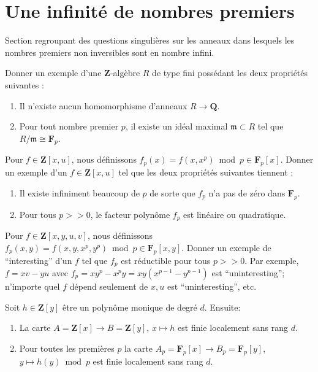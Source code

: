 \section{Une infinité de nombres premiers}
\label{section-many-primes}

\noindent
Section regroupant des questions singulières sur les anneaux dans lesquels
les nombres premiers non inversibles sont en nombre infini.

\begin{exercise}
\label{exercise-not-in-Q}
Donner un exemple d'une ${\mathbf Z}$-algèbre $R$ de type fini
possédant les deux propriétés suivantes :
\begin{enumerate}
\item Il n'existe aucun homomorphisme d'anneaux $R \to {\mathbf Q}$.
\item Pour tout nombre premier $p$, il existe un idéal maximal
${\mathfrak m} \subset R$ tel que $R/{\mathfrak m} \cong {\mathbf F}_p$.
\end{enumerate}
\end{exercise}

\begin{exercise}
\label{exercise-strange-fp-1}
Pour $f \in {\mathbf Z}[x, u]$, nous définissons $f_p(x)
= f(x, x^p) \bmod p \in {\mathbf F}_p[x]$. Donner un exemple
d'un $f \in {\mathbf Z}[x, u]$ tel que les deux propriétés
suivantes tiennent :
\begin{enumerate}
\item Il existe infiniment beaucoup de $p$ de sorte que
$f_p$ n'a pas de zéro dans ${\mathbf F}_p$.
\item Pour tous $p >> 0$, le facteur polynôme
$f_p$ est linéaire ou quadratique.
\end{enumerate}
\end{exercise}

\begin{exercise}
\label{exercise-strange-fp-2}
Pour $f \in {\mathbf Z}[x, y, u, v]$, nous définissons
$f_p(x, y) = f(x, y, x^p, y^p) \bmod p \in {\mathbf F}_p[x, y]$. Donner un
exemple de ``interesting'' d'un $f$ tel que $f_p$ est réductible pour
tous $p >> 0$. Par exemple, $f = xv-yu$ avec $f_p = xy^p-x^py =
xy(x^{p-1}-y^{p-1})$ est ``uninteresting''; n'importe quel $f$ dépend seulement de $x, u$ est ``uninteresting'',
etc.
\end{exercise}

\begin{remark}
\label{remark-strange-fp}
Soit $h \in {\mathbf Z}[y]$ être un polynôme monique de degré $d$.
Ensuite:
\begin{enumerate}
\item La carte $A = {\mathbf Z}[x] \to B ={\mathbf Z}[y]$,
$x \mapsto h$ est finie localement sans rang $d$.
\item Pour toutes les premières $p$
la carte $A_p = {\mathbf F}_p[x]\to B_p = {\mathbf F}_p[y]$,
$y \mapsto h(y) \bmod p$ est finie localement sans rang $d$.
\end{enumerate}
\end{remark}

